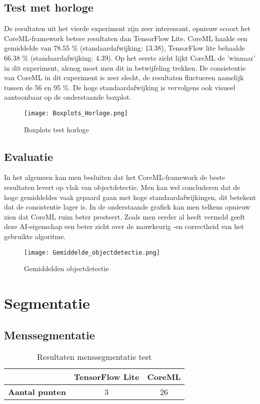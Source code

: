 \subsection{Test met horloge}
De resultaten uit het vierde experiment zijn zeer interessant, opnieuw scoort het CoreML-framework betere resultaten dan TensorFlow Lite. CoreML haalde een gemiddelde van 78.55 \% (standaardafwijking: 13.38), TensorFlow lite behaalde 66.38 \% (standaardafwijking: 4.39). Op het eerste zicht lijkt CoreML de 'winnaar' in dit experiment, alsnog moet men dit in betwijfeling trekken. De consistentie van CoreML in dit experiment is zeer slecht, de resultaten fluctueren namelijk tussen de  56 en 95 \%. De hoge standaardafwijking is vervolgens ook visueel aantoonbaar op de onderstaande boxplot.
\begin{figure}[H]
	\centering
	\texttt{[image: Boxplots\_Horloge.png]}
	\caption{Boxplots test horloge}
\end{figure}
\subsection{Evaluatie}
In het algemeen kan men besluiten dat het CoreML-framework de beste  resultaten levert op vlak van objectdetectie. Men kan wel concluderen dat de hoge gemiddeldes vaak gepaard gaan met hoge standaardafwijkingen, dit betekent dat de consistentie lager is. In de onderstaande grafiek kan men telkens opnieuw zien dat CoreML ruim beter presteert. Zoals men eerder al heeft vermeld geeft deze AI-eigenschap een beter zicht over de nauwkeurig -en correctheid van het gebruikte algoritme.
\begin{figure}[H]
	\centering
	\texttt{[image: Gemiddelde\_objectdetectie.png]}
	\caption{Gemiddelden objectdetectie}
\end{figure}

\section{Segmentatie}
\subsection{Menssegmentatie}
\begin{table}[H]
	\centering
	\begin{tabular}{|c|c|c|}
		\hline
		& \textbf{TensorFlow Lite} & \textbf{CoreML} \\ \hline
		\textbf{Aantal punten} & 3                        & 26              \\ \hline
	\end{tabular}
	\caption{Resultaten menssegmentatie test}
\end{table}
